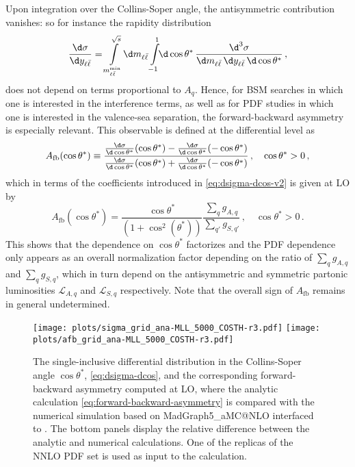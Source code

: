 Upon integration over the Collins-Soper angle, the
antisymmetric contribution vanishes: so for instance the
rapidity distribution
\begin{equation}
  \label{eq:dsigma-dyll}
  \frac{\d\sigma}{\d\yll} = \int\limits_{\mll^{\text{min}}}^{\sqrt s}\!\d\mll \int\limits_{-1}^{1}\!\!\d\cos\theta^*\, \frac{\d^3 \sigma}{\d \mll \, \d \yll \, \d\cos\theta^*} \, ,
\end{equation}
does not depend on terms proportional to $A_q$.
%
Hence, for BSM searches in which one is
interested in the interference terms, as well as for PDF studies in which one is
interested in the valence-sea separation, the forward-backward
asymmetry is especially relevant.
%
This observable is
defined at the differential level as
\begin{equation}
  A_{\text{fb}}(\cos\theta^*) \equiv \frac{ \frac{\d\sigma}{\d\cos\theta^*}(\cos\theta^*)
  - \frac{\d\sigma}{\d\cos\theta^*}(-\cos\theta^*)}{ \frac{\d\sigma}{\d\cos\theta^*}(\cos\theta^*)
  + \frac{\d\sigma}{\d\cos\theta^*}(-\cos\theta^*) } \, ,\quad \cos\theta^*>0 \, ,
  \label{eq:forward-backward-asymmetry}
\end{equation}
which in terms of the coefficients introduced in
\cref{eq:dsigma-dcos-v2} is given at LO by
\begin{equation}
  \label{eq:afb_lo}
  A_{\text{fb}}(\cos\theta^*)   = \frac{\cos\theta^*}{(1+\cos^2(\theta^*))}\frac{\sum_q g_{A,q} }{\sum_{q'} g_{S,q'}} \, ,\quad \cos\theta^*>0 \,.
\end{equation}
This  shows that the dependence on $\cos\theta^*$ factorizes
and the PDF dependence only appears as an overall normalization factor
depending on the ratio of $\sum_q g_{A,q}$
and $\sum_q g_{S,q}$, which in turn depend on the antisymmetric and symmetric
partonic luminosities $ \mathcal{L}_{A,q}$ and $ \mathcal{L}_{S,q}$ respectively.
%
Note that the overall sign of $A_{\text{fb}}$ remains in general undetermined.

\begin{figure}[t]
  \centering
  \texttt{[image: plots/sigma\_grid\_ana-MLL\_5000\_COSTH-r3.pdf]}
  \texttt{[image: plots/afb\_grid\_ana-MLL\_5000\_COSTH-r3.pdf]}
  \caption{The single-inclusive differential distribution in
    the Collins-Soper angle $\cos\theta^*$,
    \cref{eq:dsigma-dcos},
    and the corresponding forward-backward asymmetry computed at LO,
    where the analytic calculation  \cref{eq:forward-backward-asymmetry}
    is compared with the numerical simulation based on 
    {\sc\small MadGraph5\_aMC@NLO}
    interfaced to \pineappl.
    The bottom panels display the relative difference between the analytic and
    numerical calculations.
    One of the replicas of the  NNLO PDF set is used as input
    to the calculation.
  }    
  \label{fig:lo-diff-cos}
\end{figure}

